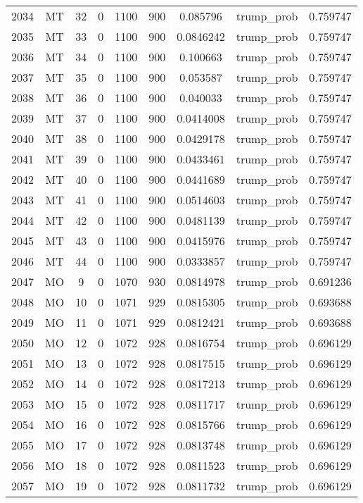 \documentclass[12pt,a4paper]{article}
\begin{document}
\begin{tabular}{r|cccccccc}
	2034 & MT & 32 & 0 & 1100 & 900 & 0.085796 & trump\_prob & 0.759747 \\
	2035 & MT & 33 & 0 & 1100 & 900 & 0.0846242 & trump\_prob & 0.759747 \\
	2036 & MT & 34 & 0 & 1100 & 900 & 0.100663 & trump\_prob & 0.759747 \\
	2037 & MT & 35 & 0 & 1100 & 900 & 0.053587 & trump\_prob & 0.759747 \\
	2038 & MT & 36 & 0 & 1100 & 900 & 0.040033 & trump\_prob & 0.759747 \\
	2039 & MT & 37 & 0 & 1100 & 900 & 0.0414008 & trump\_prob & 0.759747 \\
	2040 & MT & 38 & 0 & 1100 & 900 & 0.0429178 & trump\_prob & 0.759747 \\
	2041 & MT & 39 & 0 & 1100 & 900 & 0.0433461 & trump\_prob & 0.759747 \\
	2042 & MT & 40 & 0 & 1100 & 900 & 0.0441689 & trump\_prob & 0.759747 \\
	2043 & MT & 41 & 0 & 1100 & 900 & 0.0514603 & trump\_prob & 0.759747 \\
	2044 & MT & 42 & 0 & 1100 & 900 & 0.0481139 & trump\_prob & 0.759747 \\
	2045 & MT & 43 & 0 & 1100 & 900 & 0.0415976 & trump\_prob & 0.759747 \\
	2046 & MT & 44 & 0 & 1100 & 900 & 0.0333857 & trump\_prob & 0.759747 \\
	2047 & MO & 9 & 0 & 1070 & 930 & 0.0814978 & trump\_prob & 0.691236 \\
	2048 & MO & 10 & 0 & 1071 & 929 & 0.0815305 & trump\_prob & 0.693688 \\
	2049 & MO & 11 & 0 & 1071 & 929 & 0.0812421 & trump\_prob & 0.693688 \\
	2050 & MO & 12 & 0 & 1072 & 928 & 0.0816754 & trump\_prob & 0.696129 \\
	2051 & MO & 13 & 0 & 1072 & 928 & 0.0817515 & trump\_prob & 0.696129 \\
	2052 & MO & 14 & 0 & 1072 & 928 & 0.0817213 & trump\_prob & 0.696129 \\
	2053 & MO & 15 & 0 & 1072 & 928 & 0.0811717 & trump\_prob & 0.696129 \\
	2054 & MO & 16 & 0 & 1072 & 928 & 0.0815766 & trump\_prob & 0.696129 \\
	2055 & MO & 17 & 0 & 1072 & 928 & 0.0813748 & trump\_prob & 0.696129 \\
	2056 & MO & 18 & 0 & 1072 & 928 & 0.0811523 & trump\_prob & 0.696129 \\
	2057 & MO & 19 & 0 & 1072 & 928 & 0.0811732 & trump\_prob & 0.696129 \\

\end{tabular}
\end{document}
